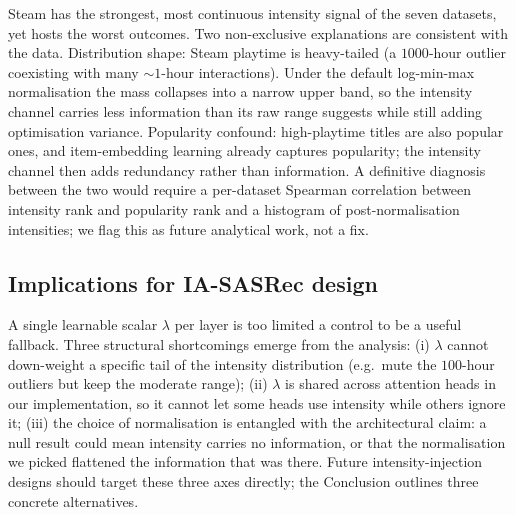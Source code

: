 Steam has the strongest, most continuous intensity signal of the
seven datasets, yet hosts the worst outcomes. Two non-exclusive
explanations are consistent with the data. Distribution shape:
Steam playtime is heavy-tailed (a $1000$-hour outlier coexisting with
many $\sim\!1$-hour interactions). Under the default log-min-max normalisation the
mass collapses into a narrow upper band, so the intensity channel
carries less information than its raw range suggests while still
adding optimisation variance. Popularity confound: high-playtime
titles are also popular ones, and item-embedding learning already
captures popularity; the intensity channel then adds redundancy
rather than information. A definitive diagnosis between the two would
require a per-dataset Spearman correlation between intensity rank and
popularity rank and a histogram of post-normalisation intensities;
we flag this as future analytical work, not a fix.

\subsection{Implications for IA-SASRec design}
\label{sec:analysis:design}

A single learnable scalar $\lambda$ per layer is too limited a control
to be a useful fallback. Three structural shortcomings emerge from
the analysis: (i) $\lambda$ cannot down-weight a specific tail of the
intensity distribution (e.g.\ mute the $100$-hour outliers but keep
the moderate range); (ii) $\lambda$ is shared across attention heads
in our implementation, so it cannot let some heads use intensity while
others ignore it; (iii) the choice of normalisation is entangled with the architectural claim:
a null result could mean intensity carries no information, or that the
normalisation we picked flattened the information that was there. Future
intensity-injection designs should target these three axes directly;
the Conclusion outlines three concrete alternatives.
